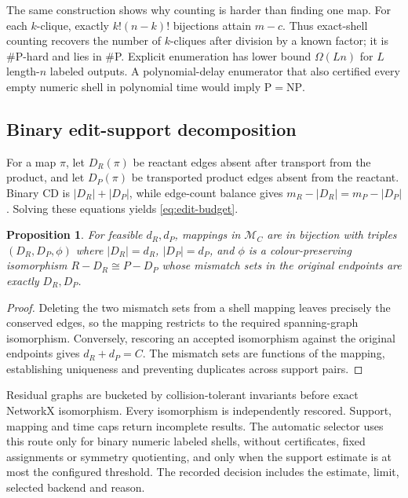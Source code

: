 \documentclass[11pt]{article}
\newtheorem{proposition}{Proposition}
\begin{document}
The same construction shows why counting is harder than finding one map.  For
each $k$-clique, exactly $k!(n-k)!$ bijections attain $m-c$.  Thus exact-shell
counting recovers the number of $k$-cliques after division by a known factor;
it is \#P-hard and lies in \#P.  Explicit enumeration has lower bound
$\Omega(Ln)$ for $L$ length-$n$ labeled outputs.  A polynomial-delay enumerator
that also certified every empty numeric shell in polynomial time would imply
$\mathrm P=\mathrm{NP}$.

\subsection*{Binary edit-support decomposition}

For a map $\pi$, let $D_R(\pi)$ be reactant edges absent after transport from
the product, and let $D_P(\pi)$ be transported product edges absent from the
reactant.  Binary CD is $|D_R|+|D_P|$, while edge-count balance gives
$m_R-|D_R|=m_P-|D_P|$.  Solving these equations yields
\cref{eq:edit-budget}.

\begin{proposition}
For feasible $d_R,d_P$, mappings in $\mathcal M_C$ are in bijection with
triples $(D_R,D_P,\phi)$ where $|D_R|=d_R$, $|D_P|=d_P$, and $\phi$ is a
colour-preserving isomorphism $R-D_R\cong P-D_P$ whose mismatch sets in the
original endpoints are exactly $D_R,D_P$.
\end{proposition}

\begin{proof}
Deleting the two mismatch sets from a shell mapping leaves precisely the
conserved edges, so the mapping restricts to the required spanning-graph
isomorphism.  Conversely, rescoring an accepted isomorphism against the
original endpoints gives $d_R+d_P=C$.  The mismatch sets are functions of the
mapping, establishing uniqueness and preventing duplicates across support
pairs.
\end{proof}

Residual graphs are bucketed by collision-tolerant invariants before exact
NetworkX isomorphism.  Every isomorphism is independently rescored.  Support,
mapping and time caps return incomplete results.  The automatic selector uses
this route only for binary numeric labeled shells, without certificates, fixed
assignments or symmetry quotienting, and only when the support estimate is at
most the configured threshold.  The recorded decision includes the estimate,
limit, selected backend and reason.
\end{document}
